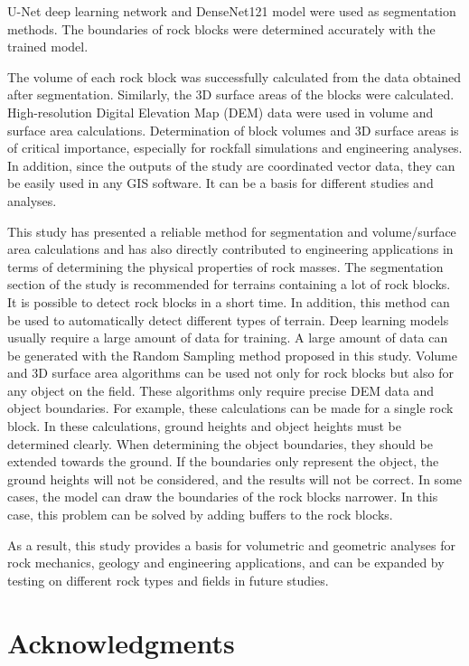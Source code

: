 \documentclass[a4paper,fleqn]{cas-sc}
\begin{document}
U-Net deep learning network and DenseNet121 model were used as segmentation methods. The boundaries of rock blocks were determined accurately with the trained model.

The volume of each rock block was successfully calculated from the data obtained after segmentation. Similarly, the 3D surface areas of the blocks were calculated. High-resolution Digital Elevation Map (DEM) data were used in volume and surface area calculations. Determination of block volumes and 3D surface areas is of critical importance, especially for rockfall simulations and engineering analyses. In addition, since the outputs of the study are coordinated vector data, they can be easily used in any GIS software. It can be a basis for different studies and analyses.

This study has presented a reliable method for segmentation and volume/surface area calculations and has also directly contributed to engineering applications in terms of determining the physical properties of rock masses. The segmentation section of the study is recommended for terrains containing a lot of rock blocks. It is possible to detect rock blocks in a short time. In addition, this method can be used to automatically detect different types of terrain. Deep learning models usually require a large amount of data for training. A large amount of data can be generated with the Random Sampling method proposed in this study. Volume and 3D surface area algorithms can be used not only for rock blocks but also for any object on the field. These algorithms only require precise DEM data and object boundaries. For example, these calculations can be made for a single rock block. In these calculations, ground heights and object heights must be determined clearly. When determining the object boundaries, they should be extended towards the ground. If the boundaries only represent the object, the ground heights will not be considered, and the results will not be correct. In some cases, the model can draw the boundaries of the rock blocks narrower. In this case, this problem can be solved by adding buffers to the rock blocks.

As a result, this study provides a basis for volumetric and geometric analyses for rock mechanics, geology and engineering applications, and can be expanded by testing on different rock types and fields in future studies.


\section{Acknowledgments}
\end{document}
